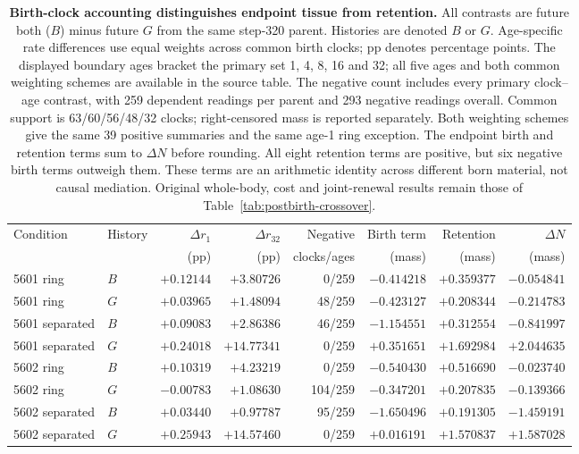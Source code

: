 \begin{table}[!htbp]
\centering
\small
\setlength{\tabcolsep}{3pt}
\begin{tabular}{llrrrrrr}
\toprule
Condition & History & $\Delta r_1$ & $\Delta r_{32}$ & Negative & Birth term & Retention & $\Delta N$ \\
 & & (pp) & (pp) & clocks/ages & (mass) & (mass) & (mass) \\
\midrule
5601 ring & $B$ & $+0.12144$ & $+3.80726$ & 0/259 & $-0.414218$ & $+0.359377$ & $-0.054841$ \\
5601 ring & $G$ & $+0.03965$ & $+1.48094$ & 48/259 & $-0.423127$ & $+0.208344$ & $-0.214783$ \\
5601 separated & $B$ & $+0.09083$ & $+2.86386$ & 46/259 & $-1.154551$ & $+0.312554$ & $-0.841997$ \\
5601 separated & $G$ & $+0.24018$ & $+14.77341$ & 0/259 & $+0.351651$ & $+1.692984$ & $+2.044635$ \\
5602 ring & $B$ & $+0.10319$ & $+4.23219$ & 0/259 & $-0.540430$ & $+0.516690$ & $-0.023740$ \\
5602 ring & $G$ & $-0.00783$ & $+1.08630$ & 104/259 & $-0.347201$ & $+0.207835$ & $-0.139366$ \\
5602 separated & $B$ & $+0.03440$ & $+0.97787$ & 95/259 & $-1.650496$ & $+0.191305$ & $-1.459191$ \\
5602 separated & $G$ & $+0.25943$ & $+14.57460$ & 0/259 & $+0.016191$ & $+1.570837$ & $+1.587028$ \\
\bottomrule
\end{tabular}
\caption{\textbf{Birth-clock accounting distinguishes endpoint tissue from retention.} All contrasts are future both ($B$) minus future $G$ from the same step-320 parent. Histories are denoted $B$ or $G$. Age-specific rate differences use equal weights across common birth clocks; pp denotes percentage points. The displayed boundary ages bracket the primary set 1, 4, 8, 16 and 32; all five ages and both common weighting schemes are available in the source table. The negative count includes every primary clock--age contrast, with 259 dependent readings per parent and 293 negative readings overall. Common support is 63/60/56/48/32 clocks; right-censored mass is reported separately. Both weighting schemes give the same 39 positive summaries and the same age-1 ring exception. The endpoint birth and retention terms sum to $\Delta N$ before rounding. All eight retention terms are positive, but six negative birth terms outweigh them. These terms are an arithmetic identity across different born material, not causal mediation. Original whole-body, cost and joint-renewal results remain those of Table~\ref{tab:postbirth-crossover}.}
\label{tab:birth-clock-accounting}
\end{table}
